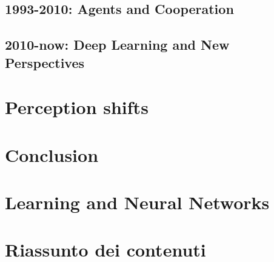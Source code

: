 \documentclass[oneside,notitlepage]{report}
\begin{document}
\section{1993-2010: Agents and Cooperation}


\section{2010-now: Deep Learning and New Perspectives}


\chapter{Perception shifts}




\chapter{Conclusion}


\appendix
\chapter{Learning and Neural Networks}


\chapter{Riassunto dei contenuti}

\printbibliography
\end{document}
